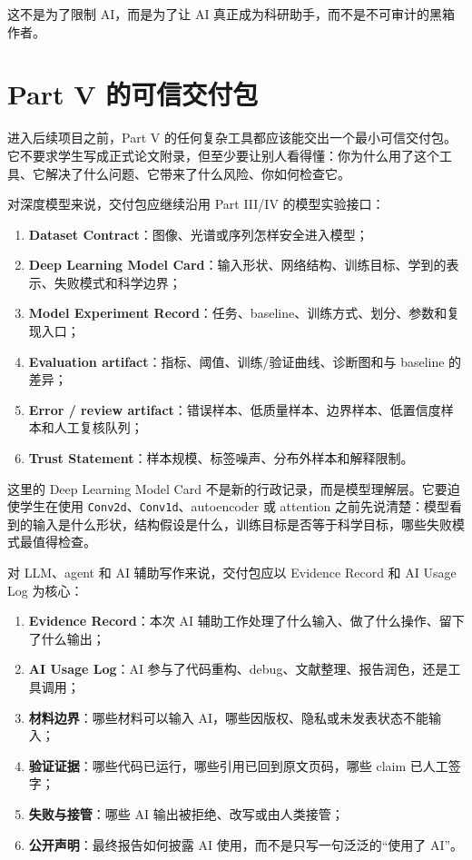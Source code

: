 这不是为了限制 AI，而是为了让 AI 真正成为科研助手，而不是不可审计的黑箱作者。

\section*{Part V 的可信交付包}

进入后续项目之前，Part V 的任何复杂工具都应该能交出一个最小可信交付包。它不要求学生写成正式论文附录，但至少要让别人看得懂：你为什么用了这个工具、它解决了什么问题、它带来了什么风险、你如何检查它。

对深度模型来说，交付包应继续沿用 Part III/IV 的模型实验接口：

\begin{enumerate}
    \item \textbf{Dataset Contract}：图像、光谱或序列怎样安全进入模型；
    \item \textbf{Deep Learning Model Card}：输入形状、网络结构、训练目标、学到的表示、失败模式和科学边界；
    \item \textbf{Model Experiment Record}：任务、baseline、训练方式、划分、参数和复现入口；
    \item \textbf{Evaluation artifact}：指标、阈值、训练/验证曲线、诊断图和与 baseline 的差异；
    \item \textbf{Error / review artifact}：错误样本、低质量样本、边界样本、低置信度样本和人工复核队列；
    \item \textbf{Trust Statement}：样本规模、标签噪声、分布外样本和解释限制。
\end{enumerate}

这里的 Deep Learning Model Card 不是新的行政记录，而是模型理解层。它要迫使学生在使用 \texttt{Conv2d}、\texttt{Conv1d}、autoencoder 或 attention 之前先说清楚：模型看到的输入是什么形状，结构假设是什么，训练目标是否等于科学目标，哪些失败模式最值得检查。

对 LLM、agent 和 AI 辅助写作来说，交付包应以 Evidence Record 和 AI Usage Log 为核心：

\begin{enumerate}
    \item \textbf{Evidence Record}：本次 AI 辅助工作处理了什么输入、做了什么操作、留下了什么输出；
    \item \textbf{AI Usage Log}：AI 参与了代码重构、debug、文献整理、报告润色，还是工具调用；
    \item \textbf{材料边界}：哪些材料可以输入 AI，哪些因版权、隐私或未发表状态不能输入；
    \item \textbf{验证证据}：哪些代码已运行，哪些引用已回到原文页码，哪些 claim 已人工签字；
    \item \textbf{失败与接管}：哪些 AI 输出被拒绝、改写或由人类接管；
    \item \textbf{公开声明}：最终报告如何披露 AI 使用，而不是只写一句泛泛的“使用了 AI”。
\end{enumerate}


